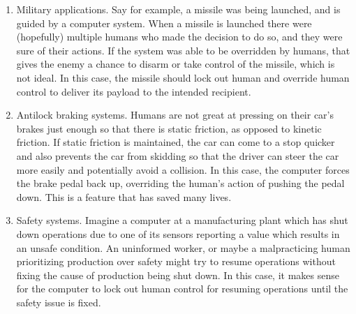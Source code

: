 \begin{enumerate}
  \item Military applications. Say for example, a missile was being launched,
    and is guided by a computer system. When a missile is launched there were
    (hopefully) multiple humans who made the decision to do so, and they were
    sure of their actions. If the system was able to be overridden by humans,
    that gives the enemy a chance to disarm or take control of the missile,
    which is not ideal. In this case, the missile should lock out human and
    override human control to deliver its payload to the intended recipient.

  \item Antilock braking systems. Humans are not great at pressing on their
    car's brakes just enough so that there is static friction, as opposed to
    kinetic friction. If static friction is maintained, the car can come to a
    stop quicker and also prevents the car from skidding so that the driver can
    steer the car more easily and potentially avoid a collision. In this case,
    the computer forces the brake pedal back up, overriding the human's action
    of pushing the pedal down. This is a feature that has saved many lives.

  \item Safety systems. Imagine a computer at a manufacturing plant which has
    shut down operations due to one of its sensors reporting a value which
    results in an unsafe condition. An uninformed worker, or maybe a
    malpracticing human prioritizing production over safety might try to resume
    operations without fixing the cause of production being shut down. In this
    case, it makes sense for the computer to lock out human control for resuming
    operations until the safety issue is fixed.
\end{enumerate}
